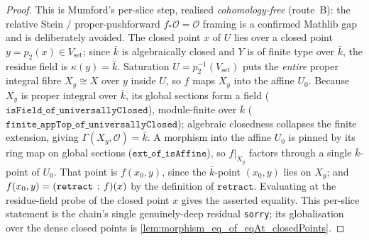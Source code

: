 \begin{proof}
  \leanok
  This is Mumford's per-slice step, realised \emph{cohomology-free} (route~B): the relative Stein /
  proper-pushforward \(f_*\mathcal O = \mathcal O\) framing is a confirmed Mathlib gap and is
  deliberately avoided. The closed point \(x\) of \(U\) lies over a closed point
  \(y = p_2(x) \in V_{\mathrm{set}}\); since \(\bar k\) is algebraically closed and \(Y\) is of finite type
  over \(\bar k\), the residue field is \(\kappa(y) = \bar k\). Saturation \(U = p_2^{-1}(V_{\mathrm{set}})\)
  puts the \emph{entire} proper integral fibre \(X_y \cong X\) over \(y\) inside \(U\), so \(f\) maps \(X_y\)
  into the affine \(U_0\). Because \(X_y\) is proper integral over \(\bar k\), its global sections form a
  field (\(\mathtt{isField\_of\_universallyClosed}\)), module-finite over \(\bar k\)
  (\(\mathtt{finite\_appTop\_of\_universallyClosed}\)); algebraic closedness collapses the finite
  extension, giving \(\Gamma(X_y, \mathcal O) = \bar k\).
  A morphism into the affine \(U_0\) is pinned by
  its ring map on global sections (\(\mathtt{ext\_of\_isAffine}\)), so \(f|_{X_y}\) factors through a
  single \(\bar k\)-point of \(U_0\). That point is \(f(x_0, y)\), since the \(\bar k\)-point \((x_0, y)\) lies
  on \(X_y\); and \(f(x_0, y) = (\mathtt{retract} \fatsemi f)(x)\) by the definition of \(\mathtt{retract}\).
  Evaluating at the residue-field probe of the closed point \(x\) gives the asserted equality. This
  per-slice statement is the chain's single genuinely-deep residual \texttt{sorry}; its globalisation
  over the dense closed points is \cref{lem:morphism_eq_of_eqAt_closedPoints}.
\end{proof}
